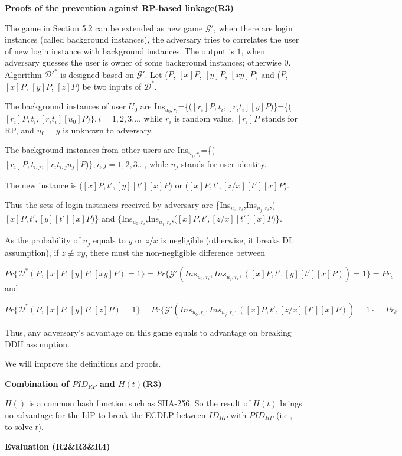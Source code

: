 \documentclass{article}
\begin{document}
\textbf{Proofs of the prevention against RP-based linkage(R3)}

The game in Section 5.2 can be extended as new game $\mathcal{G'}$,
    when there are login instances (called background instances),
    the adversary tries to correlates the user of new login instance with background instances.
The output is $1$, when adversary guesses the user is owner of some background instances;
    otherwise $0$.
   Algorithm $\mathcal{D'}^*$ is designed based on $\mathcal{G'}$.
Let ($P$, $[x]P$, $[y]P$, $[xy]P$) and  ($P$, $[x]P$, $[y]P$, $[z]P$) be two inputs of $\mathcal{D}^*$.

The background instances of user ${U_0}$ are Ins$_{u_0,r_i}$=\{($[r_i]P,t_i,[r_it_i][y]P)$\}=\{($[r_i]P,t_i,[r_it_i][u_0]P)\},i=1,2,3...$, while $r_i$ is random value, $[r_i]P$ stands for RP, and $u_0=y$ is unknown to adversary.

The background instances from other users are Ins$_{u_j,r_i}$=\{($[r_i]P,t_{i,j},[r_it_{i,j}u_j]P)\},i,j=1,2,3...$, while $u_j$ stands for user identity.

The new instance is ($[x]P,t',[y][t'][x]P$) or ($[x]P,t',[z/x][t'][x]P$).

Thus the sets of login instances received by adversary are \{Ins$_{u_0,r_i}$,Ins$_{u_j,r_i}$,($[x]P,t',[y][t'][x]P$)\} and \{Ins$_{u_0,r_i}$,Ins$_{u_j,r_i}$,($[x]P,t',[z/x][t'][x]P$)\}.


As  the  probability of $u_j$ equals to $y$ or $z/x$ is negligible (otherwise, it breaks DL assumption),
if $z\not\equiv xy$, there must the non-negligible difference between 

$Pr\{\mathcal{D}^*(P,[x]P,[y]P,[xy]P)=1\}=Pr\{\mathcal{G'}({Ins_{u_0,r_i}, Ins_{u_j,r_i},([x]P,t',[y][t'][x]P)})=1\}=Pr_c$ and

$Pr\{\mathcal{D}^*(P,[x]P,[y]P,[z]P)=1\}
=Pr\{\mathcal{G'}({Ins_{u_0,r_i},Ins_{u_j,r_i},([x]P,t',[z/x][t'][x]P)})=1\}=Pr_{\bar{c}}$

Thus, any adversary's advantage on this game equals to advantage on breaking DDH assumption.

We will improve the definitions and proofs.

\textbf{Combination of $PID_{RP}$ and $H(t)$(R3)}

$H()$ is a common hash function such as SHA-256. So the result of $H(t)$ brings no advantage for the IdP to break the ECDLP between $ID_{RP}$ with $PID_{RP}$ (i.e., to solve $t$).

\textbf{Evaluation (R2\&R3\&R4)}
\end{document}
